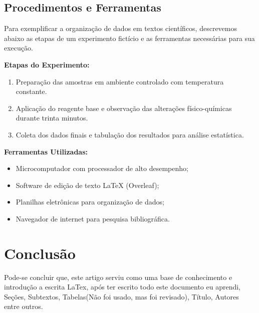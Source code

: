 \documentclass{article}
\begin{document}
    \subsection{Procedimentos e Ferramentas}

    Para exemplificar a organização de dados em textos científicos, descrevemos abaixo as etapas de um experimento fictício e as ferramentas necessárias para sua execução.

    \noindent \textbf{Etapas do Experimento:}
    \begin{enumerate}
        \item Preparação das amostras em ambiente controlado com temperatura constante.
        \item Aplicação do reagente base e observação das alterações físico-químicas durante trinta minutos.
        \item Coleta dos dados finais e tabulação dos resultados para análise estatística.
    \end{enumerate}

    \noindent \textbf{Ferramentas Utilizadas:}
    \begin{itemize}
        \item Microcomputador com processador de alto desempenho;
        \item Software de edição de texto LaTeX (Overleaf);
        \item Planilhas eletrônicas para organização de dados;
        \item Navegador de internet para pesquisa bibliográfica.
    \end{itemize}

\section{Conclusão}

Pode-se concluir que, este artigo serviu como uma base de conhecimento e introdução a escrita LaTex, após ter escrito todo este documento eu aprendi, Seções, Subtextos, Tabelas(Não foi usado, mas foi revisado), Título, Autores entre outros.
\end{document}
